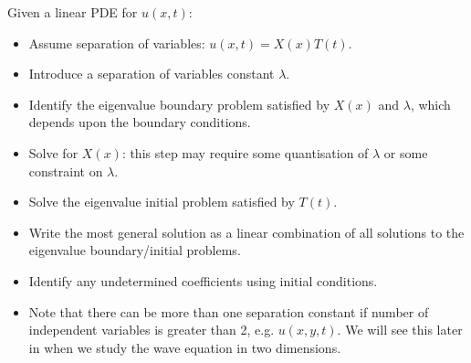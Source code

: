 Given a linear PDE for $u(x,t)$:
\begin{itemize}
	\item Assume separation of variables: $u(x,t) = X(x)T(t)$.
	\item Introduce a separation of variables constant $\lambda$.
	\item Identify the eigenvalue boundary problem satisfied by $X(x)$ and $\lambda$, which depends upon the boundary conditions.
	\item Solve for $X(x)$: this step may require some quantisation of $\lambda$ or some constraint on $\lambda$.
	\item Solve the eigenvalue initial problem satisfied by $T(t)$.
	\item Write the most general solution as a linear combination of all solutions to the eigenvalue boundary/initial problems.
	\item Identify any undetermined coefficients using initial conditions.
	\item Note that there can be more than one separation constant if number of independent variables is greater than 2, e.g. $u(x,y,t)$.
We will see this later in  when we study the wave equation in two dimensions.
\end{itemize}
